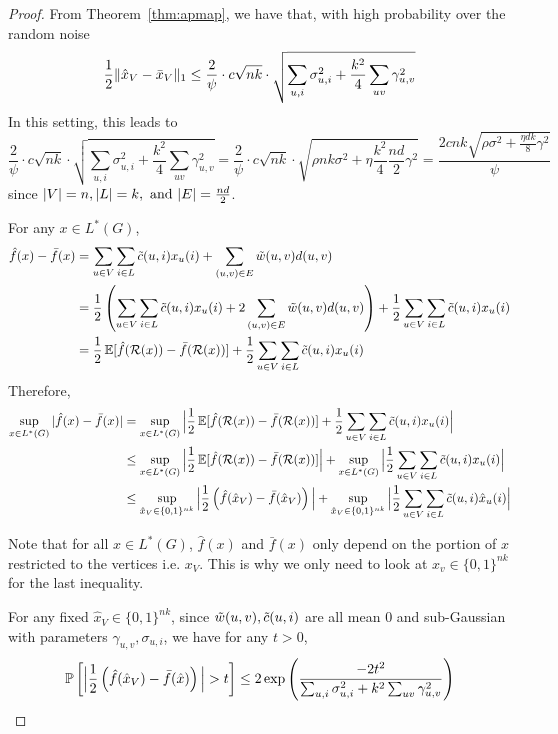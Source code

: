 \mapreg*
\begin{proof}
From Theorem~\ref{thm:apmap}, we have that, with high probability over the random noise \[ \frac{1}{2}\lVert \hat{x}_V - \bar{x}_V \rVert_1 \le \frac{2}{\psi} \cdot c\sqrt{nk} \cdot \sqrt{\sum_{u,i}\sigma_{u,i}^2 + \frac{k^2}{4}\sum_{uv}\gamma_{u,v}^2} \]
In this setting, this leads to 
\[ \frac{2}{\psi} \cdot c\sqrt{nk} \cdot \sqrt{\sum_{u,i}\sigma_{u,i}^2 + \frac{k^2}{4}\sum_{uv}\gamma_{u,v}^2} = \frac{2}{\psi} \cdot c\sqrt{nk} \cdot \sqrt{\rho nk\sigma^2 + \eta \frac{k^2}{4} \frac{nd}{2} \gamma^2}
    = \frac{2cnk\sqrt{\rho \sigma^2 + \frac{\eta dk}{8} \gamma^2}}{\psi} \]
since $|V| = n, |L| = k, \text{ and } |E| = \frac{nd}{2}$.

\iffalse
For any $x \in L^*(G)$,
\begin{align*}
    \hat f(x) - \bar{f}(x) &= \sum_{u \in V} \sum_{i\in L} \tilde{c}(u,i) x_u(i) + \sum_{(u,v) \in E} \tilde{w}(u,v)d(u,v)
    \\&= \frac{1}{2} \left(\sum_{u \in V} \sum_{i\in L} \tilde{c}(u,i) x_u(i) + 2\sum_{(u,v) \in E} \tilde{w}(u,v)d(u,v)\right) + \frac{1}{2} \sum_{u \in V} \sum_{i\in L} \tilde{c}(u,i) x_u(i)
    \\&= \frac{1}{2}\operatorname*{\mathbb{E}}[\hat{f}(\mathcal{R}(x)) - \bar{f}(\mathcal{R}(x))] + \frac{1}{2} \sum_{u \in V} \sum_{i\in L} \tilde{c}(u,i) x_u(i)
\end{align*}
Therefore,
\begin{align*}
\sup_{x \in L^*(G)}|\hat f(x) - \bar{f}(x)| &= \sup_{x \in L^*(G)} \Big| \frac{1}{2} \operatorname*{\mathbb{E}}[\hat f(\mathcal{R}(x)) - \bar{f}(\mathcal{R}(x))] + \frac{1}{2}\sum_{u \in V} \sum_{i \in L} \tilde{c}(u,i)x_u(i) \Big|
\\&\leq \sup_{x \in L^*(G)} \Big| \frac{1}{2} \operatorname*{\mathbb{E}}[\hat f(\mathcal{R}(x)) - \bar{f}(\mathcal{R}(x))]\Big| + \sup_{x \in L^*(G)} \Big|\frac{1}{2}\sum_{u \in V} \sum_{i \in L} \tilde{c}(u,i)x_u(i) \Big|
\\&\leq \sup_{\hat x_V \in \{0,1\}^{nk}} \Big| \frac{1}{2} \left(\hat{f}(\hat x_V) - \bar{f}(\hat x_V)\right) \Big| + \sup_{\hat x_V \in \{0,1\}^{nk}} \Big|\frac{1}{2}\sum_{u \in V} \sum_{i \in L} \tilde{c}(u,i)\hat x_u(i) \Big|
\end{align*}

Note that for all $x \in L^*(G)$, $\hat{f}(x)$ and $\bar{f}(x)$ only depend on the portion of $x$ restricted to the vertices i.e. $x_V$. This is why we only need to look at $\hat{x}_v \in \{0,1\}^{nk}$ for the last inequality.

For any fixed $\hat x_V \in \{0,1\}^{nk}$, since $\tilde{w}(u,v), \tilde{c}(u,i)$ are all mean $0$ and sub-Gaussian with parameters $\gamma_{u,v}, \sigma_{u,i}$, we have for any $t > 0$,
\[ \mathbb{P} \left[\Big| \frac{1}{2} \left(\hat f(\hat x_V) - \bar{f}(\hat x)\right) \Big| > t\right] \leq 2\exp\left(\frac{-2t^2}{\sum_{u,i}\sigma_{u,i}^2 + k^2\sum_{uv}\gamma_{u,v}^2}\right) \]


\end{proof}

